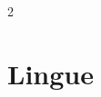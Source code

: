 \documentclass[10pt]{article} %
\begin{document}
\begin{paracol}{2}



    \section{Lingue}





\end{paracol}
\end{document}
